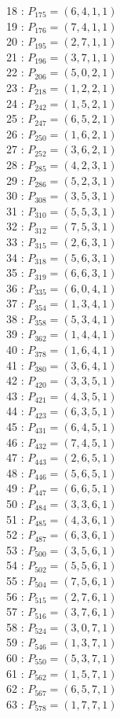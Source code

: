 \documentclass{article}
\begin{document}
{\begin{multicols}{2}
18 : $P_{175}=( 6, 4, 1, 1 )$\\
19 : $P_{176}=( 7, 4, 1, 1 )$\\
20 : $P_{195}=( 2, 7, 1, 1 )$\\
21 : $P_{196}=( 3, 7, 1, 1 )$\\
22 : $P_{206}=( 5, 0, 2, 1 )$\\
23 : $P_{218}=( 1, 2, 2, 1 )$\\
24 : $P_{242}=( 1, 5, 2, 1 )$\\
25 : $P_{247}=( 6, 5, 2, 1 )$\\
26 : $P_{250}=( 1, 6, 2, 1 )$\\
27 : $P_{252}=( 3, 6, 2, 1 )$\\
28 : $P_{285}=( 4, 2, 3, 1 )$\\
29 : $P_{286}=( 5, 2, 3, 1 )$\\
30 : $P_{308}=( 3, 5, 3, 1 )$\\
31 : $P_{310}=( 5, 5, 3, 1 )$\\
32 : $P_{312}=( 7, 5, 3, 1 )$\\
33 : $P_{315}=( 2, 6, 3, 1 )$\\
34 : $P_{318}=( 5, 6, 3, 1 )$\\
35 : $P_{319}=( 6, 6, 3, 1 )$\\
36 : $P_{335}=( 6, 0, 4, 1 )$\\
37 : $P_{354}=( 1, 3, 4, 1 )$\\
38 : $P_{358}=( 5, 3, 4, 1 )$\\
39 : $P_{362}=( 1, 4, 4, 1 )$\\
40 : $P_{378}=( 1, 6, 4, 1 )$\\
41 : $P_{380}=( 3, 6, 4, 1 )$\\
42 : $P_{420}=( 3, 3, 5, 1 )$\\
43 : $P_{421}=( 4, 3, 5, 1 )$\\
44 : $P_{423}=( 6, 3, 5, 1 )$\\
45 : $P_{431}=( 6, 4, 5, 1 )$\\
46 : $P_{432}=( 7, 4, 5, 1 )$\\
47 : $P_{443}=( 2, 6, 5, 1 )$\\
48 : $P_{446}=( 5, 6, 5, 1 )$\\
49 : $P_{447}=( 6, 6, 5, 1 )$\\
50 : $P_{484}=( 3, 3, 6, 1 )$\\
51 : $P_{485}=( 4, 3, 6, 1 )$\\
52 : $P_{487}=( 6, 3, 6, 1 )$\\
53 : $P_{500}=( 3, 5, 6, 1 )$\\
54 : $P_{502}=( 5, 5, 6, 1 )$\\
55 : $P_{504}=( 7, 5, 6, 1 )$\\
56 : $P_{515}=( 2, 7, 6, 1 )$\\
57 : $P_{516}=( 3, 7, 6, 1 )$\\
58 : $P_{524}=( 3, 0, 7, 1 )$\\
59 : $P_{546}=( 1, 3, 7, 1 )$\\
60 : $P_{550}=( 5, 3, 7, 1 )$\\
61 : $P_{562}=( 1, 5, 7, 1 )$\\
62 : $P_{567}=( 6, 5, 7, 1 )$\\
63 : $P_{578}=( 1, 7, 7, 1 )$\\
\end{multicols}
}
\end{document}
